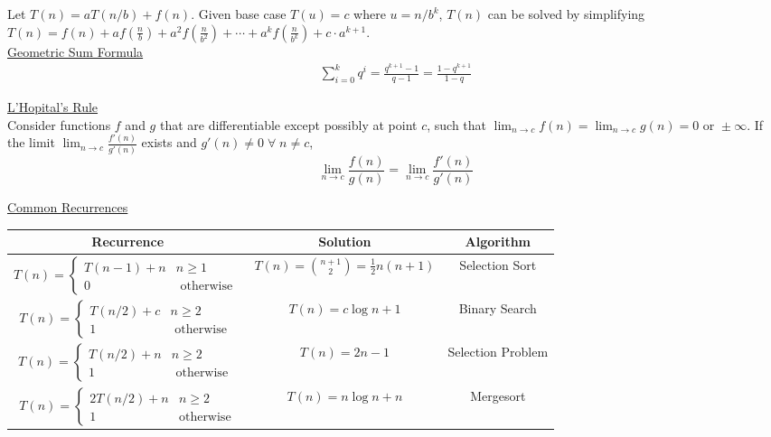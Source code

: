 \documentclass[12pt, fleqn]{general}
\begin{document}
\begin{multicols*}{2}
    Let $T(n) = a T(n/b) + f(n)$. Given base case $T(u) = c$ where $u = n/b^k$, $T(n)$ can be solved by simplifying $T(n) = f(n) + a f(\frac{n}{b}) + a^2 f(\frac{n}{b^2}) + \cdots + a^k f(\frac{n}{b^k}) + c\cdot a^{k+1}$.\\

    {\large \underline{Geometric Sum Formula}}
    \begin{align*}
        \sum_{i = 0}^k q^i = \frac{q^{k+1} - 1}{q - 1} = \frac{1-q^{k+1}}{1-q}
    \end{align*}

    {\large \underline{L'Hopital's Rule}}\\

    Consider functions $f$ and $g$ that are differentiable except possibly at point $c$, such that $\lim_{n\rightarrow c} f(n) = \lim_{n\rightarrow c} g(n) = 0 \text{ or } \pm \infty$. If the limit $\lim_{n\rightarrow c}\frac{f'(n)}{g'(n)}$ exists and $g'(n) \neq 0\;\forall\; n \neq c$,
    $$
        \lim_{n\rightarrow c} \frac{f(n)}{g(n)} = \lim_{n\rightarrow c} \frac{f'(n)}{g'(n)}
    $$
    
\end{multicols*}
    

    {\large \underline{Common Recurrences}}

    \begin{center}
    \begin{tabular}{|c|c|c|}\hline
    \textbf{Recurrence}&\textbf{Solution}&\textbf{Algorithm}\\\hline
    $T(n) = \begin{cases} T(n-1) + n & n \geq 1\\ 0 & \text{ otherwise }\end{cases}$& $T(n) = {n+1 \choose 2} = \frac{1}{2}n(n+1)$&Selection Sort\\\hline
    $T(n) = \begin{cases} T(n/2) + c & n \geq 2\\ 1 & \text{ otherwise }\end{cases}$& $T(n) = c \log n + 1$ & Binary Search\\\hline
    $T(n) = \begin{cases} T(n/2) + n & n \geq 2\\ 1 & \text{ otherwise }\end{cases}$& $T(n) = 2n - 1$ & Selection Problem\\\hline
    $T(n) = \begin{cases}2 T(n/2) + n & n \geq 2\\ 1 & \text{otherwise}\end{cases}$& $T(n) = n \log n + n$ & Mergesort\\\hline
    \end{tabular}\\
    \end{center}
\end{document}
